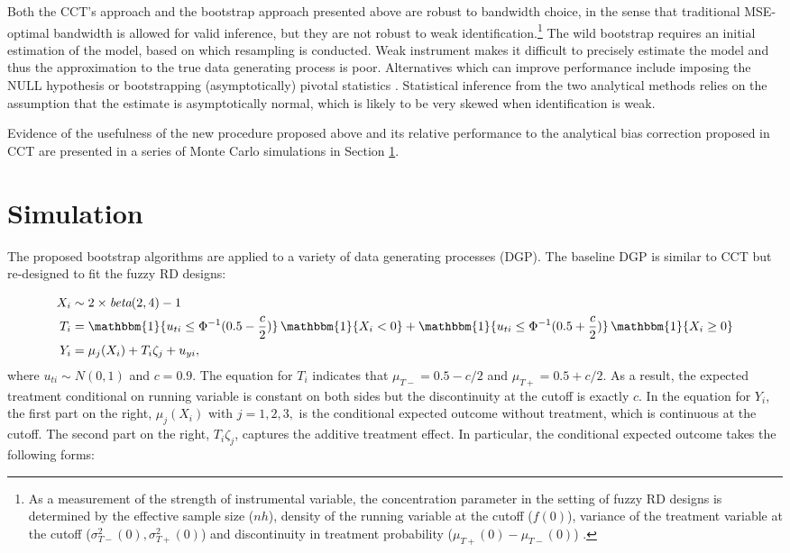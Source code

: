 \documentclass[12pt,]{article}
\DeclareMathOperator{\1}{\mathbbm{1}}
\begin{document}
Both the CCT's approach and the bootstrap approach presented above are robust to bandwidth choice, in the sense that traditional MSE-optimal bandwidth is allowed for valid inference, but they are not robust to weak identification.\footnote{As a measurement of the strength of instrumental variable, the concentration parameter in the setting of fuzzy RD designs is determined by the effective sample size ($nh$), density of the running variable at the cutoff ($f(0)$), variance of the treatment variable at the cutoff ($\sigma_{T-}^2(0), \sigma_{T+}^2(0)$) and discontinuity in treatment probability ($\mu_{T+}(0) - \mu_{T-}(0)$) \citep{feir2016weak}.} The wild bootstrap requires an initial estimation of the model, based on which resampling is conducted. Weak instrument makes it difficult to precisely estimate the model and thus the approximation to the true data generating process is poor. Alternatives which can improve performance include imposing the NULL hypothesis or bootstrapping (asymptotically) pivotal statistics \citep{davidson2008wild,cameron2008bootstrap}. Statistical inference from the two analytical methods relies on the assumption that the estimate is asymptotically normal, which is likely to be very skewed when identification is weak.

Evidence of the usefulness of the new procedure proposed above and its relative performance to the analytical bias correction proposed in CCT are presented in a series of Monte Carlo simulations in Section \ref{se: simulation}.

\section{Simulation}
\label{se: simulation}

The proposed bootstrap algorithms are applied to a variety of data generating processes (DGP). The baseline DGP is similar to CCT but re-designed to fit the fuzzy RD designs:

\begin{align*}
X_i & \sim  2 \times \textit{beta}(2,4) - 1 \\
T_i & = \1 \{u_{ti} \le \Phi^{-1} (0.5 - \frac{c}{2}) \}  \1 \{ X_i < 0\} + 
\1 \{u_{ti} \le \Phi^{-1} (0.5 + \frac{c}{2}) \}  \1 \{ X_i \ge 0\} \\
Y_i & = \mu_j (X_i) + T_i \zeta_j + u_{yi},
\end{align*}
where $u_{ti} \sim N(0, 1)$ and $c = 0.9$. The equation for $T_i$ indicates that $\mu_{T-} = 0.5 - c/2$ and $\mu_{T+} = 0.5 + c/2$. As a result, the expected treatment conditional on running variable is constant on both sides but the discontinuity at the cutoff is exactly $c$. In the equation for $Y_i$, the first part on the right, $\mu_j(X_i)$ with $j = 1, 2, 3,$ is the conditional expected outcome without treatment, which is continuous at the cutoff. The second part on the right, $T_i \zeta_j$, captures the additive treatment effect. In particular, the conditional expected outcome takes the following forms:
\end{document}
